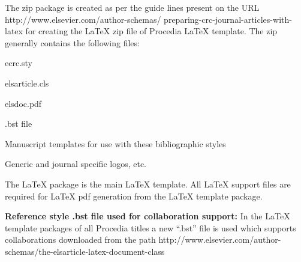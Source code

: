 \documentclass[5p,times,procedia]{elsarticle}
\begin{document}
The zip package is created as per the guide lines present on the URL http://www.elsevier.com/author-schemas/ preparing-crc-journal-articles-with-latex for creating the LaTeX zip file of Procedia LaTeX template.  The zip generally contains the following files:
\begin{Itemize}[]\leftskip-12.7pt
\item ecrc.sty
\item  elsarticle.cls
\item elsdoc.pdf
\item .bst file
\item Manuscript templates for use with these bibliographic styles
\item  Generic and journal specific logos, etc.
\end{Itemize}

The LaTeX package is the main LaTeX template. All LaTeX support files are required for LaTeX pdf generation from the LaTeX template package.

{\bf Reference style .bst file used for collaboration support:} In the LaTeX template packages of all Procedia titles a new ``.bst'' file is used which supports collaborations downloaded from the path http://www.elsevier.com/author-schemas/the-elsarticle-latex-document-class
\end{document}
